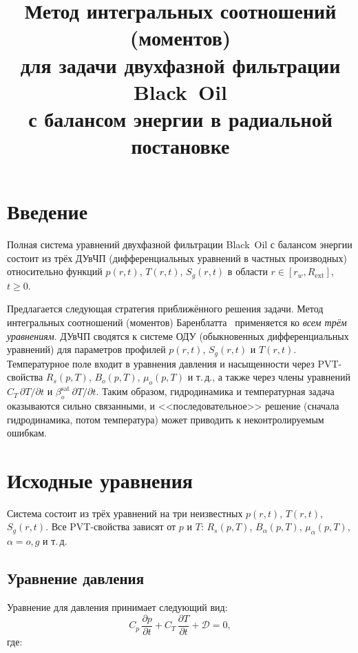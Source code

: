 \documentclass[12pt,a4paper]{article}
\title{Метод интегральных соотношений (моментов)\\
для задачи двухфазной фильтрации Black~Oil\\
с балансом энергии в радиальной постановке}
\author{}
\date{}
\newcommand{\pp}{\partial}
\newcommand{\ext}{\mathrm{ext}}
\newcommand{\sat}{\mathrm{sat}}
\begin{document}
\maketitle
\tableofcontents
\newpage

\section{Введение}\label{sec:intro}

Полная система уравнений двухфазной фильтрации Black~Oil с балансом
энергии состоит из трёх ДУвЧП (дифференциальных уравнений в частных производных)
относительно функций $p(r,t)$, $T(r,t)$, $S_g(r,t)$ в области $r\in[r_w, R_\ext]$,
$t \geqslant 0$.

Предлагается следующая стратегия приближённого решения задачи. Метод интегральных соотношений
(моментов) Баренблатта~\cite{barenblatt1954} применяется ко
\emph{всем трём уравнениям}. ДУвЧП сводятся к системе ОДУ (обыкновенных дифференциальных уравнений) 
для параметров профилей $p(r,t)$, $S_g(r,t)$ и $T(r,t)$.
Температурное поле входит в уравнения давления и
насыщенности через PVT-свойства $R_s(p,T)$, $B_o(p,T)$,
$\mu_o(p,T)$ и т.\,д., а также через члены уравнений
$C_T\,\pp T/\pp t$ и $\beta_o^\sat\,\pp T/\pp t$. Таким образом, гидродинамика и температурная задача
оказываются сильно связанными, и <<последовательное>> решение
(сначала гидродинамика, потом температура) может приводить
к неконтролируемым ошибкам.


\section{Исходные уравнения}\label{sec:equations}

Система состоит из трёх уравнений на три неизвестных
$p(r,t)$, $T(r,t)$, $S_g(r,t)$. Все PVT-свойства зависят
от $p$ и $T$: $R_s(p,T)$, $B_{\alpha}(p,T)$,
$\mu_\alpha(p,T)$, $\alpha = o, g$ и т.\,д.

\subsection{Уравнение давления}

Уравнение для давления принимает следующий вид:
\begin{equation}\label{eq:p_eq}
  \boxed{
    C_p\,\frac{\pp p}{\pp t}
    + C_T\,\frac{\pp T}{\pp t}
    + \mathcal{D} = 0,
  }
\end{equation}
где:
\end{document}
